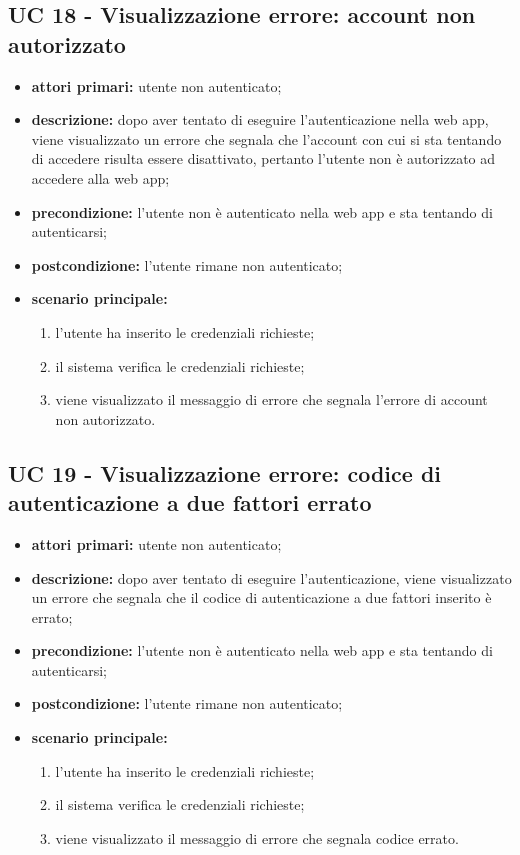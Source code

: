 
		\subsection{UC 18 - Visualizzazione errore: account non autorizzato}
		\begin{itemize}
			\item \textbf{attori primari:} utente non autenticato;
			\item \textbf{descrizione:} dopo aver tentato di eseguire l'autenticazione nella web app, viene visualizzato un errore che segnala che l'account con cui si sta tentando di accedere risulta essere disattivato, pertanto l'utente non è autorizzato ad accedere alla web app;
			\item \textbf{precondizione:} l'utente non è autenticato nella web app e sta tentando di autenticarsi;
			\item \textbf{postcondizione:} l'utente rimane non autenticato;
			\item \textbf{scenario principale:}
			\begin{enumerate}
				\item l'utente ha inserito le credenziali richieste;
				\item il sistema verifica le credenziali richieste;
				\item viene visualizzato il messaggio di errore che segnala l'errore di account non autorizzato.
			\end{enumerate}
		\end{itemize}


		\subsection{UC 19 - Visualizzazione errore: codice di autenticazione a due fattori errato}
		\begin{itemize}
			\item \textbf{attori primari:} utente non autenticato;
			\item \textbf{descrizione:} dopo aver tentato di eseguire l'autenticazione, viene visualizzato un errore che segnala che il codice di autenticazione a due fattori inserito è errato;
			\item \textbf{precondizione:} l'utente non è autenticato nella web app e sta tentando di autenticarsi;
			\item \textbf{postcondizione:} l'utente rimane non autenticato;
			\item \textbf{scenario principale:}
			\begin{enumerate}
				\item l'utente ha inserito le credenziali richieste;
				\item il sistema verifica le credenziali richieste;
				\item viene visualizzato il messaggio di errore che segnala codice errato.
			\end{enumerate}
		\end{itemize}


